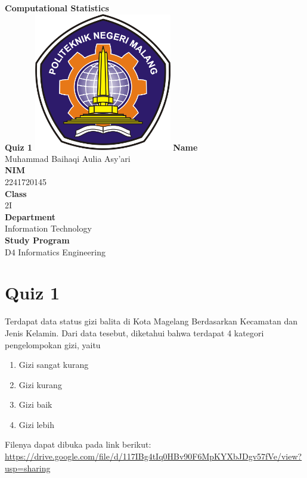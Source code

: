 \documentclass[12pt,titlepage]{article}
\newcommand{\vSubject}{Computational Statistics}
\newcommand{\vSubtitle}{Quiz 1}
\newcommand{\vName}{Muhammad Baihaqi Aulia Asy'ari}
\newcommand{\vNIM}{2241720145}
\newcommand{\vClass}{2I}
\newcommand{\vDepartment}{Information Technology}
\newcommand{\vStudyProgram}{D4 Informatics Engineering}
\begin{document}
\begin{titlepage}
    \centering
    \vfill
    {\bfseries\LARGE
        \vSubject\\
        \vskip0.25cm
        \vSubtitle
    }
    \vfill
    \includegraphics[width=6cm]{images/polinema-logo.png}
    \vfill
    {
        \textbf{Name}\\
        \vName\\
        \vskip0.5cm
        \textbf{NIM}\\
        \vNIM\\
        \vskip0.5cm
        \textbf{Class}\\
        \vClass\\
        \vskip0.5cm
        \textbf{Department}\\
        \vDepartment\\
        \vskip0.5cm
        \textbf{Study Program}\\
        \vStudyProgram
    }
\end{titlepage}

\newpage

\section*{Quiz 1}

Terdapat data status gizi balita di Kota Magelang Berdasarkan Kecamatan dan Jenis Kelamin. Dari data tesebut, diketahui bahwa terdapat 4 kategori pengelompokan gizi, yaitu

\begin{enumerate}
    \item Gizi sangat kurang
    \item Gizi kurang
    \item Gizi baik
    \item Gizi lebih
\end{enumerate}

Filenya dapat dibuka pada link berikut:\\
\url{https://drive.google.com/file/d/117IBg4tIq0HBv90F6MpKYXbJDgv57fVe/view?usp=sharing}
\end{document}
